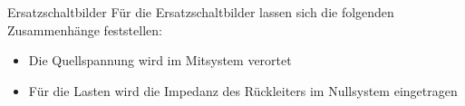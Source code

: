 \begin{frame}

    \begin{Merksatz}{Ersatzschaltbilder}
        Für die Ersatzschaltbilder lassen sich die folgenden Zusammenhänge feststellen:
        \begin{itemize}
            \item Die Quellspannung wird im Mitsystem verortet
            \item Für die Lasten wird die Impedanz des Rückleiters im Nullsystem eingetragen
        \end{itemize}
    \end{Merksatz}

\end{frame}